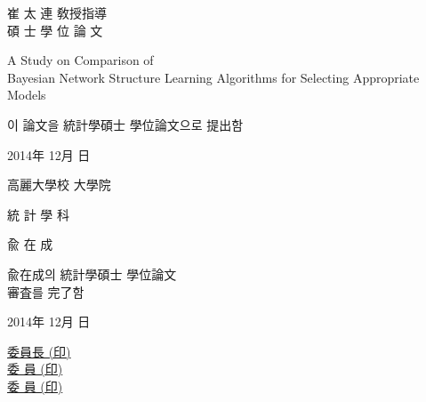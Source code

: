 \documentclass[12pt,a4paper,oneside]{book}
\theoremstyle{plain}
\theoremstyle{definition}
\theoremstyle{remark}
\theoremstyle{definition}
\numberwithin{equation}{chapter}
\begin{document}
\newpage{}
 \linespread{1.0}
 \thispagestyle{empty}
 \vspace{15mm}
 \begin{center}
 {\Large 崔 太 連 敎授指導 \\ 碩 士 學 位 論 文
}
 \end{center}
 \vspace{20mm}
 \begin{center}
  \LARGE A Study on Comparison of\\ Bayesian Network Structure Learning Algorithms for Selecting Appropriate Models
 \end{center}
 \vspace{20mm}
 \begin{center}
 {\Large 이 論文을 統計學碩士 學位論文으로 提出함}
 \end{center}
 \vspace{15mm}
 \begin{center}
 {\Large 2014年 \quad 12月 \quad 日}
 \end{center}
 \vspace{20mm}
 \begin{center}
 {\Large 高麗大學校 大學院}
 \end{center}
	 \begin{center}
  {\Large 統 計 學 科}
 \end{center}
 \begin{center}
 {\Large 兪 \quad\quad 在 \quad\quad 成}
 \end{center}
 \linespread{1.6}





\newpage{}		
 \linespread{1.0}
 \thispagestyle{empty}
 \vspace{20mm}
 \begin{center}
 {\LARGE 兪在成의 統計學碩士 學位論文 \\ 審査를 完了함}
 \end{center}
 \vspace{50mm}
 \begin{center}
{\Large 2014年 \quad 12月 \quad 日}
 \end{center}
 \vspace{55mm}
 \begin{center}
 {\Large  \underline{委員長 \hspace{60mm} (印)} \\ \vspace{7mm}
          \underline{委 \quad 員\hspace{60mm} (印)} \\ \vspace{7mm}
          \underline{委 \quad 員\hspace{60mm} (印)} \\ }
 \end{center}
 \linespread{1.6}
\end{document}
